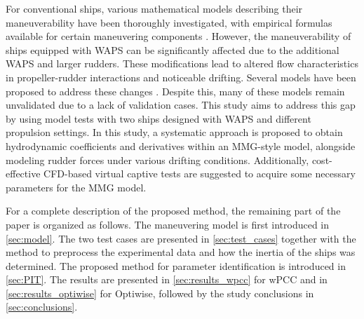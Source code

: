 For conventional ships, various mathematical models describing their maneuverability have been thoroughly investigated, with empirical formulas available for certain maneuvering components \citep{yasukawaIntroductionMMGStandard2015}. However, the maneuverability of ships equipped with WAPS can be significantly affected due to the additional WAPS and larger rudders. These modifications lead to altered flow characteristics in propeller-rudder interactions and noticeable drifting.
Several models have been proposed to address these changes \citep{violaNumericalMethodDesign2015,tillig4DOFSimulation2019,kjellbergSailingPerformanceWindPowered2023,guzelbulutInvestigationEfficiencyWindassisted2024a}. Despite this, many of these models remain unvalidated due to a lack of validation cases. This study aims to address this gap by using model tests with two ships designed with WAPS and different propulsion settings.
In this study, a systematic approach is proposed to obtain hydrodynamic coefficients and derivatives within an MMG-style model, alongside modeling rudder forces under various drifting conditions. Additionally, cost-effective CFD-based virtual captive tests are suggested to acquire some necessary parameters for the MMG model.

For a complete description of the proposed method, the remaining part of the paper is organized as follows. The maneuvering model is first introduced in \autoref{sec:model}. The two test cases are presented in \autoref{sec:test_cases} together with the method to preprocess the experimental data and how the inertia of the ships was determined. The proposed method for parameter identification is introduced in \autoref{sec:PIT}. The results are presented in \autoref{sec:results_wpcc} for wPCC and in \autoref{sec:results_optiwise} for Optiwise, followed by the study conclusions in \autoref{sec:conclusions}.



